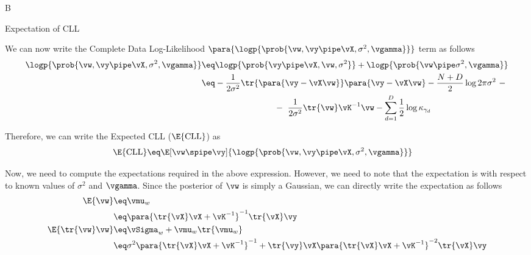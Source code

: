 \documentclass{article}
\begin{document}
\begin{question}
\begin{qpart}{B}
		\begin{qsubsection}{Expectation of CLL}

			We can now write the Complete Data Log-Likelihood $\para{\logp{\prob{\vw, \vy \pipe \vX, \sigma^2, \vgamma}}}$ term as follows
			\begin{align*}
				\logp{\prob{\vw, \vy \pipe \vX, \sigma^2, \vgamma}}	&\eq	\logp{\prob{\vy \pipe \vX, \vw, \sigma^2}} + \logp{\prob{\vw \pipe \sigma^2, \vgamma}} \\
				&\eq	- \frac{1}{2 \sigma^2} \tr{\para{\vy - \vX \vw}} \para{\vy - \vX \vw} - \frac{N + D}{2} \log{2 \pi \sigma^2} \ - \\
				&\hspace{3cm} -\ \frac{1}{2 \sigma^2} \tr{\vw} \vK^{-1} \vw - \sum_{d = 1}^D \frac{1}{2} \log{\kappa_{\gamma_d}}
			\end{align*}

			Therefore, we can write the Expected CLL ($\E{\text{CLL}}$) as
			\begin{align*}
				\E{\text{CLL}}	&\eq	\E[\vw \spipe \vy]{\logp{\prob{\vw, \vy \pipe \vX, \sigma^2, \vgamma}}}
			\end{align*}

			Now, we need to compute the expectations required in the above expression. However, we need to note that the expectation is with respect to known values of $\sigma^2$ and $\vgamma$. Since the posterior of $\vw$ is simply a Gaussian, we can directly write the expectation as follows
			\begin{align*}
				\E{\vw}	&\eq	\vmu_w \\
				&\eq	\para{\tr{\vX} \vX + \vK^{-1}}^{-1} \tr{\vX} \vy \\
				\E{\tr{\vw} \vw}	&\eq	\vSigma_w + \vmu_w \tr{\vmu_w} \\
				&\eq	\sigma^2 \para{\tr{\vX} \vX + \vK^{-1}}^{-1} + \tr{\vy} \vX \para{\tr{\vX} \vX + \vK^{-1}}^{-2} \tr{\vX} \vy
			\end{align*}

		\end{qsubsection}


\end{qpart}
\end{question}
\end{document}
